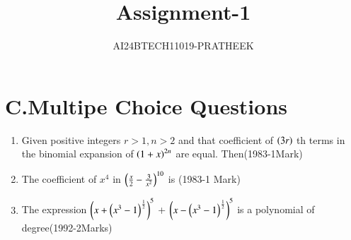\documentclass[journal]{IEEEtran}
\begin{document}

\vspace{3cm}

\title{Assignment-1}
\author{AI24BTECH11019-PRATHEEK}
\maketitle
\bigskip
\renewcommand{\thefigure}{\theenumi}
\renewcommand{\thetable}{\theenumi}

\section*{{C.Multipe Choice Questions}}
\begin{enumerate}
\item   Given positive integers $r>1,n>2$ and that {coefficient} of $\left(3r\right)$ th terms in the binomial expansion of $\left(1+x\right)^{2n}$ are equal. Then\hfill(1983-1Mark)
\begin{enumerate}
\end{enumerate}
\item The coefficient of $x^4$ in $\left(\frac{x}{2}-\frac{3}{x^2}\right)^{10}$ is \hfill(1983-1 Mark)
\begin{enumerate}
\end{enumerate}
\item The expression $\left(x+\left(x^3-1\right)^{\frac{1}{2}}\right)^5$ + $\left(x-\left(x^3-1\right)^{\frac{1}{2}}\right)^5$ is a polynomial of degree\hfill(1992-2Marks)
\begin{enumerate}
\begin{multicols}{2}
    


\end{multicols}
\end{enumerate}
\end{enumerate}
\end{document}
